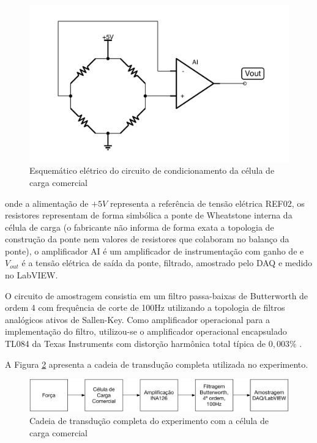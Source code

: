 \documentclass[a4paper]{instrumentacao}
\begin{document}
\begin{figure}[H]
\center
\includegraphics[width=\textwidth]{Comercial-Circuito.pdf}
\caption{Esquemático elétrico do circuito de condicionamento da célula de carga comercial}
\label{fig:celula-comercial-metodologia-condicionamento}
\end{figure}

\noindent onde a alimentação de $+5V$ representa a referência de tensão elétrica REF02, os resistores representam de forma simbólica a ponte de Wheatstone interna da célula de carga (o fabricante não informa de forma exata a topologia de construção da ponte nem valores de resistores que colaboram no balanço da ponte), o amplificador AI é um amplificador de instrumentação com ganho de  e $V_{out}$ é a tensão elétrica de saída da ponte, filtrado, amostrado pelo DAQ e medido no LabVIEW.

O circuito de amostragem consistia em um filtro passa-baixas de Butterworth de ordem 4 com frequência de corte de 100Hz utilizando a topologia de filtros analógicos ativos de Sallen-Key. Como amplificador operacional para a implementação do filtro, utilizou-se o amplificador operacional encapsulado TL084 da Texas Instruments com distorção harmônica total típica de $0,003\%$ \cite{datasheet-tl084}.

A Figura \ref{fig:celula-comercial-cadeia-transducao} apresenta a cadeia de transdução completa utilizada no experimento.

\begin{figure}[H]
\center
\includegraphics[width=\textwidth]{Comercial-Cadeia-Transducao.pdf}
\caption{Cadeia de transdução completa do experimento com a célula de carga comercial}
\label{fig:celula-comercial-cadeia-transducao}
\end{figure}
\end{document}
